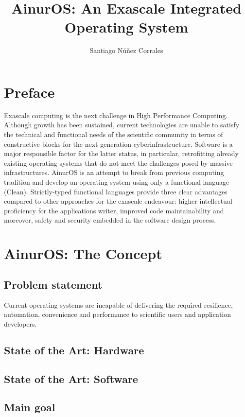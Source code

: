 \documentclass[10pt,a4paper,twocolumn,titlepage]{report}
\author{Santiago Núñez Corrales}
\title{AinurOS: An Exascale Integrated Operating System}
\begin{document}
\maketitle

\tableofcontents

\chapter*{Preface}
Exascale computing is the next challenge in High Performance Computing. Although growth has been sustained, current technologies are unable to satisfy the technical and functional needs of the scientific community in terms of constructive blocks for the next generation cyberinfrastructure. Software is a major responsible factor for the latter status, in particular, retrofitting already existing operating systems that do not meet the challenges posed by massive infrastructures. AinurOS is an attempt to break from previous computing tradition and develop an operating system using only a functional language (Clean). Strictly-typed functional languages provide three clear advantages compared to other approaches for the exascale endeavour: higher intellectual proficiency for the applications writer, improved code maintainability and moreover, safety and security embedded in the software design process.

\chapter{AinurOS: The Concept}

\section{Problem statement}

Current operating systems are incapable of delivering the required resilience, automation, convenience and performance to scientific users and application developers.

\section{State of the Art: Hardware}

\section{State of the Art: Software}

\section{Main goal}
\end{document}
